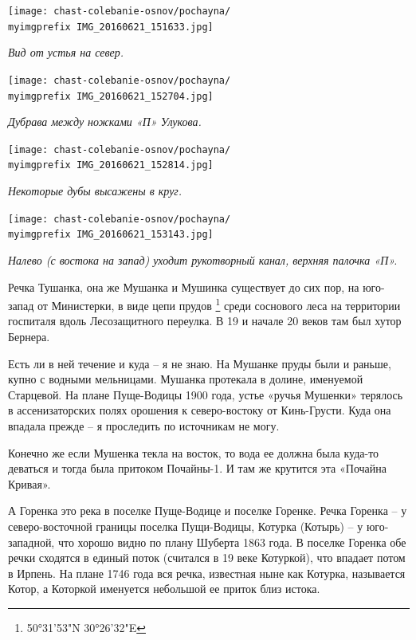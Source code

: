\begin{center}
\texttt{[image: chast-colebanie-osnov/pochayna/\\myimgprefix IMG\_20160621\_151633.jpg]}

\textit{Вид от устья на север.}
\end{center}

\begin{center}
\texttt{[image: chast-colebanie-osnov/pochayna/\\myimgprefix IMG\_20160621\_152704.jpg]}

\textit{Дубрава между ножками «П» Улукова.}
\end{center}

\newpage
  
\begin{center}
\texttt{[image: chast-colebanie-osnov/pochayna/\\myimgprefix IMG\_20160621\_152814.jpg]}

\textit{Некоторые дубы высажены в круг.}
\end{center}
 
\begin{center}
\texttt{[image: chast-colebanie-osnov/pochayna/\\myimgprefix IMG\_20160621\_153143.jpg]}

\textit{Налево (с востока на запад) уходит рукотворный канал, верхняя палочка «П».}
\end{center}

Речка Тушанка, она же Мушанка и Мушинка существует до сих пор, на юго-запад от Министерки, в виде цепи прудов \footnote{50°31'53"N 30°26'32"E} среди соснового леса на территории госпиталя  вдоль Лесозащитного переулка. В 19 и начале 20 веков там был хутор Бернера.

Есть ли в ней течение и куда – я не знаю. На Мушанке пруды были и раньше, купно с водными мельницами. Мушанка протекала в долине, именуемой Старцевой. На плане Пуще-Водицы 1900 года, устье «ручья Мушенки» терялось в ассенизаторских полях орошения к северо-востоку от Кинь-Грусти. Куда она впадала прежде – я проследить по источникам не могу.

Конечно же если Мушенка текла на восток, то вода ее должна была куда-то деваться и тогда была притоком Почайны-1. И там же крутится эта «Почайна Кривая».

А Горенка это река в поселке Пуще-Водице и поселке Горенке. Речка Горенка – у северо-восточной границы поселка Пущи-Водицы, Котурка (Котырь) – у юго-западной, что хорошо видно по плану Шуберта 1863 года. В поселке Горенка обе речки сходятся в единый поток (считался в 19 веке Котуркой), что впадает потом в Ирпень. На плане 1746 года вся речка, известная ныне как Котурка, называется Котор, а Которкой именуется небольшой ее приток близ истока.


